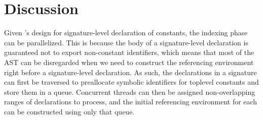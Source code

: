 

\section{Discussion}



Given \Beluga's design for signature-level declaration of constants, the indexing phase can be parallelized.
This is because the body of a signature-level declaration is guaranteed not to export non-constant identifiers, which means that most of the \ac{AST} can be disregarded when we need to construct the referencing environment right before a signature-level declaration.
As such, the declarations in a signature can first be traversed to preallocate symbolic identifiers for toplevel constants and store them in a queue.
Concurrent threads can then be assigned non-overlapping ranges of declarations to process, and the initial referencing environment for each can be constructed using only that queue.
